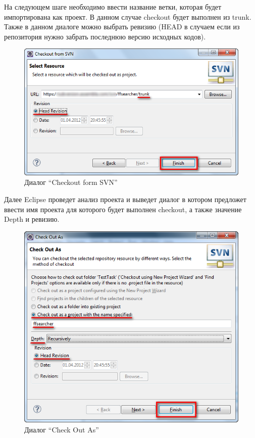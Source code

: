 \documentclass[a4paper,12pt]{article}
\begin{document}
На следующем шаге необходимо ввести название ветки, которая будет
импортирована как проект. В данном случае checkout будет выполнен из
trunk. Также в данном диалоге можно выбрать ревизию (HEAD в случаем если
из репозитория нужно забрать последнюю версию исходных кодов).

\begin{figure}[h!]
 	\centering
	\includegraphics[scale=0.80]{eclipse-checkout-step-5.png}
	\vspace{-10pt}
	\caption{Диалог ``Checkout form SVN''}
\end{figure}

Далее Eclipse проведет анализ проекта и выведет диалог в котором
предложет ввести имя проекта для которого будет выполнен checkout, а
также значение Depth и ревизию.

\begin{figure}[h!]
	\centering
	\includegraphics[scale=1]{eclipse-checkout-step-6.png}
	\vspace{-10pt}
	\caption{Диалог ``Check Out As''}
\end{figure}
\end{document}
